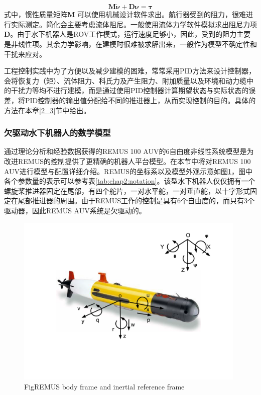 \begin{equation}
\label{eq:5}
\bm{M} \bm{\dot \nu} + \bm{D} \bm{\nu} =  \bm {\tau }
\end{equation}
式中，惯性质量矩阵$\bm{M}$ 可以使用机械设计软件求出。航行器受到的阻力，很难进行实际测定。简化会主要考虑流体阻尼。一般使用流体力学软件模拟求出阻尼力项$\bm{D}$。由于水下机器人是ROV工作模式，运行速度足够小，因此，受到的阻力主要是非线性项。其余力学影响，在建模时很难被求解出来，一般作为模型不确定性和干扰来应对。

工程控制实践中为了方便以及减少建模的困难，常常采用PID方法来设计控制器，会将恢复力（矩）、流体阻力、科氏力及产生阻力、附加质量以及环境和动力缆中的干扰力等均不进行建模，而是通过使用PID控制器计算期望状态与实际状态的误差，将PID控制器的输出值分配给不同的推进器上，从而实现控制的目的。具体的方法在本章\ref{2_3}节中给出。


\subsubsection{欠驱动水下机器人的数学模型  }

通过理论分析和经验数据获得的REMUS 100 AUV的6自由度非线性系统模型是为改进REMUS的控制提供了更精确的机器人平台模型。在本节中将对REMUS 100 AUV进行模型与配置详细介绍。REMUS的坐标系以及模型外观示意如图\ref{fig:chap2:F6}，图中各个参数量的表示可以参考表\ref{tab:chap2:notation}。该型水下机器人仅仅拥有一个螺旋桨推进器固定在尾部，有四个舵片，一对水平舵，一对垂直舵，以十字形式固定在尾部推进器的周围。由于REMUS工作的控制是具有6个自由度的，而只有3个驱动器，因此REMUS AUV系统是欠驱动的。

 \begin{figure}[!htp]
 \centering
 \includegraphics[width=11cm]{figure/chap2/REMUS_paper-300ppi.png}
 \label{fig:chap2:F6}
  {Fig}{REMUS body frame and inertial reference frame\cite{wu2016parametric}}
 \end{figure}

